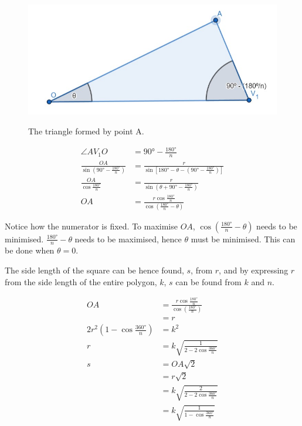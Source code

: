 \documentclass[12pt]{scrartcl}
\begin{document}
\begin{figure}[htpb]
	\centering
	\includegraphics[scale=.75]{images/rq2_1_2.jpg}
	\label{fig:rq2_1_2_img}
	\caption{The triangle formed by point A.}
\end{figure}

\begin{align*}
	\angle AV_{1}O & = \ang{90} - \frac{\ang{180}}{n}     \\
	\frac{OA}{\sin \left(\ang{90} - \frac{\ang{180}}{n}\right)} & = \frac{r}{\sin \left[\ang{180} - \theta - \left(\ang{90} - \frac{\ang{180}}{n}\right)\right]}  \\
	\frac{OA}{\cos \frac{\ang{180}}{n}} & = \frac{r}{\sin \left(\theta + \ang{90} - \frac{\ang{180}}{n}\right)}    \\
	OA & = \frac{r \cos \frac{\ang{180}}{n}}{\cos \left(\frac{\ang{180}}{n} - \theta\right)}
\end{align*}

Notice how the numerator is fixed. To maximise $OA$, $\cos \left(\frac{\ang{180}}{n} - \theta\right)$ needs to be minimised. $\frac{\ang{180}}{n} - \theta$ needs to be maximised, hence $\theta$ must be minimised. This can be done when $\theta = 0$.

The side length of the square can be hence found, $s$, from $r$, and by expressing $r$ from the side length of the entire polygon, $k$, $s$ can be found from $k$ and $n$.

\begin{align*}
	OA & = \frac{r \cos \frac{\ang{180}}{n}}{\cos \left(\frac{\ang{180}}{n}\right)}  \\
	& = r  \\
	2r^2 \left(1 - \cos \frac{\ang{360}}{n}\right) & = k^2  \\
	r & = k\sqrt{\frac{1}{2 - 2\cos\frac{\ang{360}}{n}}}  \\
	s & = OA\sqrt{2} \\
	& = r\sqrt{2} \\
	& = k\sqrt{\frac{2}{2 - 2\cos\frac{\ang{360}}{n}}}  \\
	& = k\sqrt{\frac{1}{1 - \cos\frac{\ang{360}}{n}}}
\end{align*}
\end{document}
